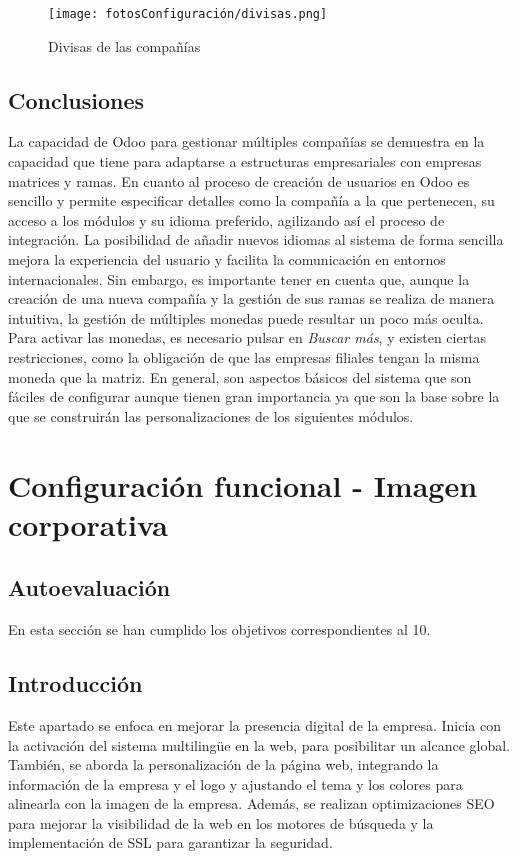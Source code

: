 \begin{figure}[h]
    \centering
    \texttt{[image: fotosConfiguración/divisas.png]}
    \caption{Divisas de las compañías}
    \label{fig:enter-label}
\end{figure}
\subsection{Conclusiones}
La capacidad de Odoo para gestionar múltiples compañías se demuestra en la capacidad que tiene para adaptarse a estructuras empresariales con empresas matrices y ramas.
En cuanto al proceso de creación de usuarios en Odoo es sencillo y permite especificar detalles como la compañía a la que pertenecen, su acceso a los módulos y su idioma preferido, agilizando así el proceso de integración. La posibilidad de añadir nuevos idiomas al sistema de forma sencilla mejora la experiencia del usuario y facilita la comunicación en entornos internacionales.
Sin embargo, es importante tener en cuenta que, aunque la creación de una nueva compañía y la gestión de sus ramas se realiza de manera intuitiva, la gestión de múltiples monedas puede resultar un poco más oculta. Para activar las monedas, es necesario pulsar en \textit{Buscar más}, y existen ciertas restricciones, como la obligación de que las empresas filiales tengan la misma moneda que la matriz.
En general, son aspectos básicos del sistema que son fáciles de configurar aunque tienen gran importancia ya que son la base sobre la que se construirán las personalizaciones de los siguientes módulos.
\newpage
\section{Configuración funcional - Imagen corporativa}
\subsection{Autoevaluación}
En esta sección se han cumplido los objetivos correspondientes al 10.
\subsection{Introducción}
Este apartado se enfoca en mejorar la presencia digital de la empresa. Inicia con la activación del sistema multilingüe en la web, para posibilitar un alcance global. También, se aborda la personalización de la página web, integrando la información de la empresa y el logo y ajustando el tema y los colores para alinearla con la imagen de la empresa. Además, se realizan optimizaciones SEO para mejorar la visibilidad de la web en los motores de búsqueda y la implementación de SSL para garantizar la seguridad.
